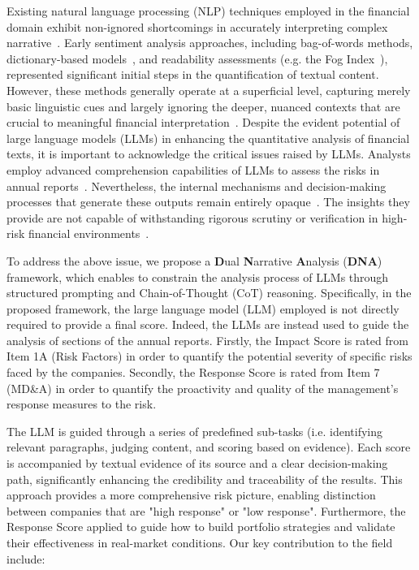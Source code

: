 \documentclass[sigconf]{acmart}
\begin{document}
Existing natural language processing (NLP) techniques employed in the financial domain exhibit non-ignored shortcomings in accurately interpreting complex narrative~\cite{loughran2016textual}. Early sentiment analysis approaches, including bag-of-words methods, dictionary-based models~\cite{loughran2011liability}, and readability assessments (e.g. the Fog Index~\cite{loughran2014measuring}), represented significant initial steps in the quantification of textual content.
However, these methods generally operate at a superficial level, capturing merely basic linguistic cues and largely ignoring the deeper, nuanced contexts that are crucial to meaningful financial interpretation~\cite{tang2025finmteb}.
Despite the evident potential of large language models (LLMs) in enhancing the quantitative analysis of financial texts, it is important to acknowledge the critical issues raised by LLMs. Analysts employ advanced comprehension capabilities of LLMs to assess the risks in annual reports~\cite{kothandapani2025ai, cao2024risklabs}. Nevertheless, the internal mechanisms and decision-making processes that generate these outputs remain entirely opaque~\cite{linardatos2020explainable}. 
The insights they provide are not capable of withstanding rigorous scrutiny or verification in high-risk financial environments~\cite{bender2021dangers}.

To address the above issue, we propose a \textbf{D}ual \textbf{N}arrative \textbf{A}nalysis (\textbf{DNA}) framework, which enables to constrain the analysis process of LLMs through structured prompting and Chain-of-Thought (CoT) reasoning. 
Specifically, in the proposed framework, the large language model (LLM) employed is not directly required to provide a final score. 
Indeed, the LLMs are instead used to guide the analysis of sections of the annual reports.
Firstly, the Impact Score is rated from Item 1A (Risk Factors) in order to quantify the potential severity of specific risks faced by the companies. 
Secondly, the Response Score is rated from Item 7 (MD\&A) in order to quantify the proactivity and quality of the management's response measures to the risk.

The LLM is guided through a series of predefined sub-tasks (i.e. identifying relevant paragraphs, judging content, and scoring based on evidence). 
Each score is accompanied by textual evidence of its source and a clear decision-making path, significantly enhancing the credibility and traceability of the results.
This approach provides a more comprehensive risk picture, enabling distinction between companies that are "high response" or "low response".
Furthermore, the Response Score applied to guide how to build portfolio strategies and validate their effectiveness in real-market conditions.
Our key contribution to the field include:
\end{document}
